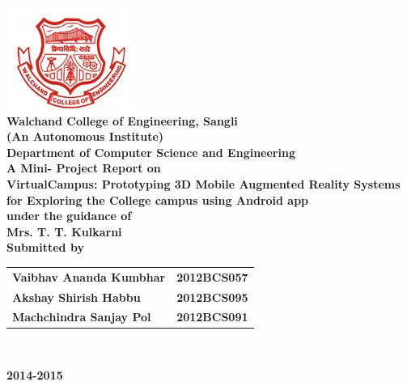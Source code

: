 \documentclass{article}
\begin{document}
\linespread{1.6}


{}
\begin{titlepage}
{
	\begin{center}
		\includegraphics[width=.2\linewidth]{walchand.jpg}\\[.5cm]
		\textbf{\Large Walchand College of Engineering, Sangli }\\
		\textbf {(An Autonomous Institute)}\\[.5cm]
		 \textbf {\LARGE Department of Computer Science and Engineering}\\[1.5cm]
		{ \large \textbf{ A  Mini- Project Report on} }\\[.5cm]
		\textbf{\Large VirtualCampus: Prototyping 3D Mobile Augmented Reality Systems for Exploring the College campus 	using Android app}\\[1cm]
		\large  \textbf{under the guidance of}\\[.3cm]
		\Large \textbf{Mrs. T. T. Kulkarni  }\\[1cm]
		\large \textbf {Submitted by}\\[.5cm]
{\setlength{\tabcolsep}{30pt}
\renewcommand{\arraystretch}{1.5}
		\begin{tabular}{ll}
			\large\textbf{Vaibhav Ananda Kumbhar } & \large\textbf{2012BCS057} 
				\\
			\large \textbf{Akshay Shirish Habbu }&\large\textbf{2012BCS095}
				\\
			\large\textbf{Machchindra Sanjay Pol} & \large\textbf{2012BCS091}
				\\
		\end{tabular}\\[1.5cm]
}

		\vfill
		\large \textbf{2014-2015 }\\[.4cm]
	\end{center}
}
\end{titlepage}
\end{document}
